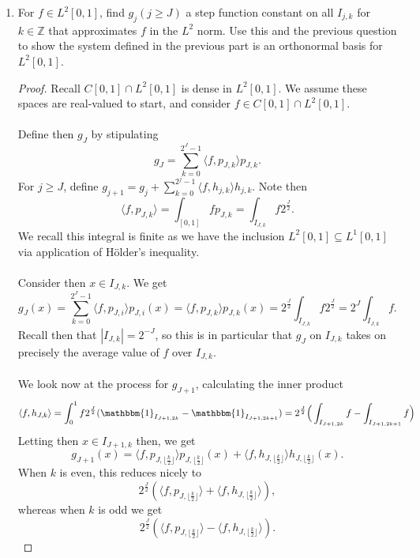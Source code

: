 \documentclass[12pt]{article}
\newenvironment{ex}[2][Exercise]{\begin{trivlist}
\item[\hskip \labelsep {\bfseries #1}\hskip \labelsep {\bfseries #2.}]}{\end{trivlist}}
\begin{document}
\begin{ex}{14}
\begin{enumerate}[label=14.\arabic*]
\begin{proof}
        \end{proof}
        \item For $f \in L^2[0,1]$, find $g_j (j \geq J)$ a step function constant on all $I_{j,k}$ for $k \in \mathbb{Z}$ that approximates $f$ in the $L^2$ norm. Use this and the previous question to show the system defined in the previous part is an orthonormal basis for $L^2[0,1]$.
        \begin{proof}
            Recall $C[0,1] \cap L^2[0,1]$ is dense in $L^2[0,1]$. We assume these spaces are real-valued to start, and consider $f \in C[0,1] \cap L^2[0,1]$. \\ \\
            Define then $g_J$ by stipulating 
            $$g_J = \sum_{k = 0}^{2^J - 1} \langle f, p_{J,k} \rangle p_{J,k}.$$
            For $j \geq J$, define $g_{j + 1} = g_j + \sum_{k = 0}^{2^j - 1} \langle f, h_{j,k}\rangle h_{j,k}$. Note then 
            $$\langle f, p_{J,k} \rangle = \int_{[0,1]} fp_{J,k} = \int_{I_{J, k}} f2^{\frac{J}{2}}.$$
            We recall this integral is finite as we have the inclusion $L^2[0,1] \subseteq L^1[0,1]$ via application of H\"older's inequality. \\ \\
            Consider then $x \in I_{J,k}$. We get 
            $$g_J(x) = \sum_{k = 0}^{2^J - 1} \langle f, p_{J,i} \rangle p_{J,i}(x) = \langle f, p_{J,k} \rangle p_{J,k}(x) = 2^{\frac{J}{2}}\int_{I_{J, k}} f2^{\frac{J}{2}} = 2^J \int_{I_{J,k}} f.$$
            Recall then that $|I_{J,k}| = 2^{-J}$, so this is in particular that $g_J$ on $I_{J,k}$ takes on precisely the average value of $f$ over $I_{J,k}$. \\ \\
            We look now at the process for $g_{J + 1}$, calculating the inner product 
            $$\langle f, h_{J,k} \rangle = \int_0^1 f2^{\frac{J}{2}}(\mathbbm{1}_{I_{J + 1, 2k}} - \mathbbm{1}_{I_{J + 1, 2k + 1}}) = 2^{\frac{J}{2}} \Big ( \int_{I_{J + 1, 2k}} f - \int_{I_{J + 1, 2k + 1}} f \Big)$$
            Letting then $x \in I_{J + 1,k}$ then, we get 
            $$g_{J + 1}(x) = \langle f, p_{J, \lfloor \frac{k}{2} \rfloor}\rangle p_{J, \lfloor \frac{k}{2} \rfloor}(x) + \langle f, h_{J, \lfloor \frac{k}{2} \rfloor}\rangle h_{J, \lfloor \frac{k}{2} \rfloor}(x).$$
            When $k$ is even, this reduces nicely to 
            $$2^{\frac{J}{2}}(\langle f, p_{J,\lfloor \frac{k}{2} \rfloor} \rangle + \langle f, h_{J,\lfloor \frac{k}{2} \rfloor} \rangle),$$
            whereas when $k$ is odd we get
            $$2^{\frac{J}{2}}(\langle f, p_{J,\lfloor \frac{k}{2} \rfloor} \rangle - \langle f, h_{J,\lfloor \frac{k}{2} \rfloor} \rangle).$$

\end{proof}
\end{enumerate}
\end{ex}
\end{document}
